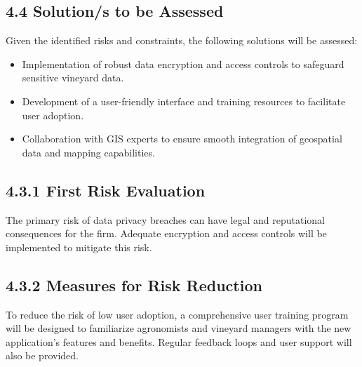 \subsection{4.4 Solution/s to be Assessed}
Given the identified risks and constraints, the following solutions will be assessed:
\begin{itemize}
    \item Implementation of robust data encryption and access controls to safeguard sensitive vineyard data.
    \item Development of a user-friendly interface and training resources to facilitate user adoption.
    \item Collaboration with GIS experts to ensure smooth integration of geospatial data and mapping capabilities.
\end{itemize}

\subsection{4.3.1 First Risk Evaluation}
The primary risk of data privacy breaches can have legal and reputational consequences for the firm. Adequate encryption and access controls will be implemented to mitigate this risk.

\subsection{4.3.2 Measures for Risk Reduction}
To reduce the risk of low user adoption, a comprehensive user training program will be designed to familiarize agronomists and vineyard managers with the new application's features and benefits. Regular feedback loops and user support will also be provided.
